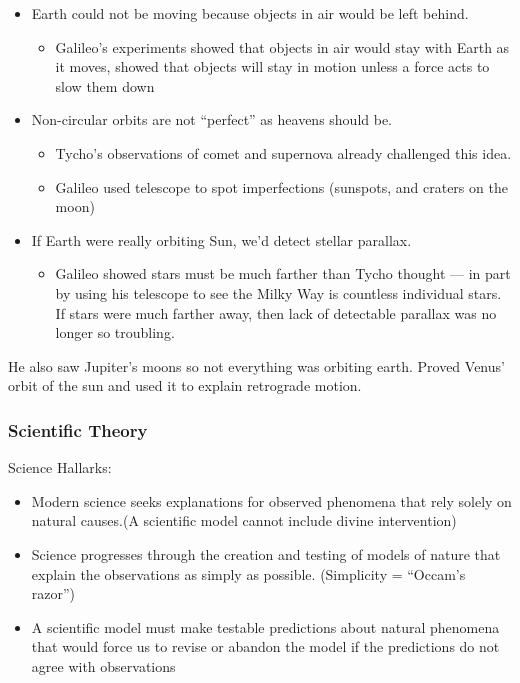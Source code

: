 \documentclass[12pt]{article}
\begin{document}
\begin{itemize}
\item Earth could not be moving because objects in air would be left behind.
\begin{itemize}
\item Galileo's experiments showed that objects in air would stay with Earth as it moves, showed that objects will stay in motion unless a force acts to slow them down
\end{itemize}
\item Non-circular orbits are not ``perfect'' as heavens should be.
\begin{itemize}
\item Tycho's observations of comet and supernova already challenged this idea.
\item Galileo used telescope to spot imperfections (sunspots, and craters on the moon)
\end{itemize}
\item If Earth were really orbiting Sun, we'd detect stellar parallax.
\begin{itemize}
\item Galileo showed stars must be much farther than Tycho thought — in part by using his telescope to see the Milky Way is countless individual stars. If stars were much farther away, then lack of detectable parallax was no longer so troubling.
\end{itemize}
\end{itemize}
He also saw Jupiter's moons so not everything was orbiting earth. Proved Venus' orbit of the sun and used it to explain retrograde motion.

\subsubsection{Scientific Theory}
Science Hallarks:
\begin{itemize}
\item Modern science seeks explanations for observed phenomena that rely solely on natural causes.(A scientific model cannot include divine intervention)
\item Science progresses through the creation and  testing of models of nature that explain the  observations as simply as possible. (Simplicity = ``Occam's razor'')
\item A scientific model must make testable predictions about natural phenomena that would force us to revise or abandon the model if the predictions do not agree with observations
\end{itemize}
\end{document}
